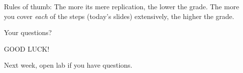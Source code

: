 \begin{frame}[standout]
Rules of thumb: The more its mere replication, the lower the grade. The more you cover \emph{each} of the steps (today's slides) extensively, the higher the grade.

\end{frame}





\begin{frame}[standout]
Your questions?
\end{frame}





\begin{frame}[standout]
GOOD LUCK!
\end{frame}


\begin{frame}[standout]

Next week, open lab if you have questions.

\end{frame}



\begin{frame}
\printbibliography
\end{frame}




